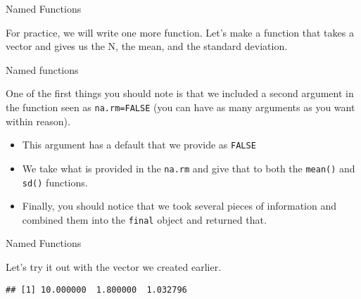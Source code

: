 \begin{frame}[fragile]{Named Functions}

For practice, we will write one more function. Let's make a function
that takes a vector and gives us the N, the mean, and the standard
deviation.

\begin{Shaded}
\begin{Highlighting}[]
\StringTok{ }\NormalTok{)\{}
\StringTok{ }
\StringTok{ }
\StringTok{ }
  
\StringTok{ }
\NormalTok{\}}
\end{Highlighting}
\end{Shaded}

\end{frame}

\begin{frame}[fragile]{Named functions}

One of the first things you should note is that we included a second
argument in the function seen as \texttt{na.rm=FALSE} (you can have as
many arguments as you want within reason).

\begin{itemize}
\tightlist
\item
  This argument has a default that we provide as \texttt{FALSE}
\item
  We take what is provided in the \texttt{na.rm} and give that to both
  the \texttt{mean()} and \texttt{sd()} functions.
\item
  Finally, you should notice that we took several pieces of information
  and combined them into the \texttt{final} object and returned that.
\end{itemize}

\end{frame}

\begin{frame}[fragile]{Named Functions}

Let's try it out with the vector we created earlier.

\begin{Shaded}
\begin{Highlighting}[]
\end{Highlighting}
\end{Shaded}

\begin{verbatim}
## [1] 10.000000  1.800000  1.032796
\end{verbatim}

\end{frame}

